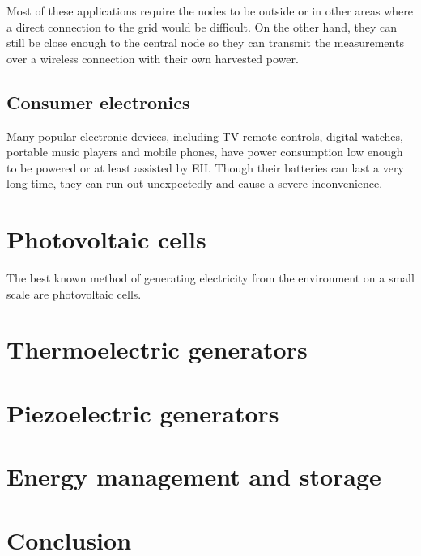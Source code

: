 \documentclass[a4paper,10pt]{article}
\begin{document}
Most of these applications require the nodes to be outside or in other areas where a direct connection to the grid would be difficult. On the other hand, they can still be close enough to the central node so they can transmit the measurements over a wireless connection with their own harvested power. 

\subsection{Consumer electronics}

Many popular electronic devices, including TV remote controls, digital watches, portable music players and mobile phones, have power consumption low enough to be powered or at least assisted by \ac{EH}. Though their batteries can last a very long time, they can run out unexpectedly and cause a severe inconvenience. 

\section{Photovoltaic cells}

The best known method of generating electricity from the environment on a small scale are photovoltaic cells. 

\section{Thermoelectric generators}

\section{Piezoelectric generators}

\section{Energy management and storage}

\section{Conclusion}

\tableofcontents
\end{document}
